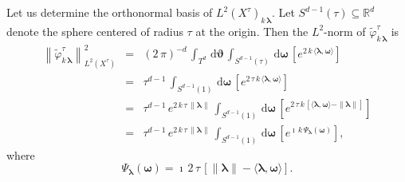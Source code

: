 \documentclass[12pt,a4paper]{article}
\theoremstyle{plain}
\theoremstyle{definition}
\begin{document}
Let us determine the orthonormal basis of 
$L^2(X^\tau)_{k\,\boldsymbol{\lambda}}$.
Let $S^{d-1}(\tau)\subseteq \mathbb{R}^d$ denote the
sphere centered of radius $\tau$ at the origin.
Then the $L^2$-norm of $\tilde{\varphi}_{k\,\boldsymbol{\lambda}}^\tau$ is
\begin{eqnarray}
\left\|\tilde{\varphi}_{k\,\boldsymbol{\lambda}}^\tau\right\|^2
_{L^2(X^\tau)}
&=&(2\,\pi)^{-d}\,\int_{T^d}\,\mathrm{d}\boldsymbol{\vartheta}
\,\int_{S^{d-1}(\tau)}\,\mathrm{d}\boldsymbol{\omega}\,
\left[e^{2\,k\,\langle\boldsymbol{\lambda},
\boldsymbol{\omega}\rangle}   \right]
\nonumber\\
&=&\tau^{d-1}\,\int_{S^{d-1}(1)}\,\mathrm{d}\boldsymbol{\omega}\,
\left[e^{2\,\tau\,k\,\langle\boldsymbol{\lambda},
\boldsymbol{\omega}\rangle}   \right]\nonumber\\
&=&\tau^{d-1}\,e^{2\,k\,\tau\,\|\boldsymbol{\lambda}\|}\,
\int_{S^{d-1}(1)}\,\mathrm{d}\boldsymbol{\omega}\,
\left[e^{2\,\tau\,k\,\left[\langle\boldsymbol{\lambda},
\boldsymbol{\omega}\rangle-
\|\boldsymbol{\lambda}\|\right]}   \right]\nonumber\\
&=&\tau^{d-1}\,e^{2\,k\,\tau\,\|\boldsymbol{\lambda}\|}\,
\int_{S^{d-1}(1)}\,\mathrm{d}\boldsymbol{\omega}\,
\left[e^{\imath\,k\,\Psi_{\boldsymbol{\lambda}}
(\boldsymbol{\omega})}   \right],\nonumber 
\end{eqnarray}
where
$$
\Psi_{\boldsymbol{\lambda}}
(\boldsymbol{\omega})=\imath\,2\,\tau\,\left[
\|\boldsymbol{\lambda}\|-
\langle\boldsymbol{\lambda},
\boldsymbol{\omega}\rangle\right].
$$
\end{document}
